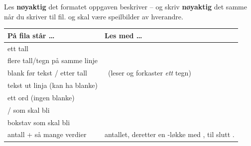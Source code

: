 

\begin{regel}
Les \textbf{nøyaktig} det formatet oppgaven beskriver -- og skriv \textbf{nøyaktig} det samme når du skriver til fil.
 og  skal være speilbilder av hverandre.
\end{regel}

\begin{center}
\begin{tabular}{@{}L{5.6cm}L{10.0cm}@{}}
\toprule
\textbf{På fila står \dots} & \textbf{Les med \dots} \\
\midrule
ett tall &  \\
flere tall/tegn på samme linje &  \\
blank før tekst /  etter tall &  \ (leser og forkaster \emph{ett} tegn) \\
tekst ut linja (kan ha blanke) &   \\
ett ord (ingen blanke) &  \\
/ som skal bli  &   \\
bokstav som skal bli  &   \\
antall + så mange verdier &  antallet, deretter en -løkke med , til slutt . \\
\bottomrule
\end{tabular}
\end{center}

